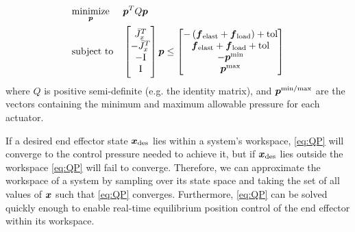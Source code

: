 \begin{equation}
\begin{aligned}
    & \underset{\p}{\text{minimize}}
    & & \p^T Q \p \\
    & \text{subject to}
    & & \mtx{\J_x^T \\ 
            -\J_x^T \\
            -\text{I} \\ \text{I}} \p
        \leq 
        \mtx{- \left( \f_{\tx{elast}} + \f_\tx{load} \right) + \text{tol} \\
            \f_{\tx{elast}} + \f_\tx{load} + \text{tol} \\
            -\p^\text{min} \\ \p^\text{max}}
\end{aligned}
\label{eq:QP}
\end{equation}
where $Q$ is positive semi-definite (e.g. the identity matrix), and $\p^\tx{min/max}$ are the vectors containing the minimum and maximum allowable pressure for each actuator.

If a desired end effector state $\x_\tx{des}$ lies within a system's workspace, \eqref{eq:QP} will converge to the control pressure needed to achieve it, but if $\x_\tx{des}$ lies outside the workspace \eqref{eq:QP} will fail to converge. Therefore, we can approximate the workspace of a system by sampling over its state space and taking the set of all values of $\x$ such that \eqref{eq:QP} converges. Furthermore, \eqref{eq:QP} can be solved quickly enough to enable real-time equilibrium position control of the end effector within its workspace.















































